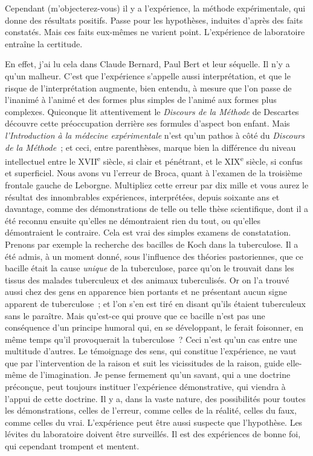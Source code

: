 \documentclass[french,twoside]{book} %
\begin{document}
Cependant (m’objecterez-vous) il y a l’expérience, la méthode expérimentale, qui donne des résultats positifs. Passe pour les hypothèses, induites d’après des faits constatés. Mais ces faits eux-mêmes ne varient point. L’expérience de laboratoire entraîne la certitude.\par
En effet, j’ai lu cela dans Claude Bernard, Paul Bert et leur séquelle. Il n’y a qu’un malheur. C’est que l’expérience s’appelle aussi interprétation, et que le risque de l’interprétation augmente, bien entendu, à mesure que l’on passe de l’inanimé à l’animé et des formes plus simples de l’animé aux formes plus complexes. Quiconque lit attentivement le {\itshape Discours de la Méthode} de Descartes découvre cette préoccupation derrière ses formules d’aspect bon enfant. Mais {\itshape l’Introduction à la médecine expérimentale} n’est qu’un pathos à côté du {\itshape Discours de la Méthode} ; et ceci, entre parenthèses, marque bien la différence du niveau intellectuel entre le XVII\textsuperscript{e} siècle, si clair et pénétrant, et le XIX\textsuperscript{e} siècle, si confus et superficiel. Nous avons vu l’erreur de Broca, quant à l’examen de la troisième frontale gauche de Leborgne. Multipliez cette erreur par dix mille et vous aurez le résultat des innombrables expériences, interprétées, depuis soixante ans et davantage, comme des démonstrations de telle ou telle thèse scientifique, dont il a été reconnu ensuite qu’elles ne démontraient rien du tout, ou qu’elles démontraient le contraire. Cela est vrai des simples examens de constatation. Prenons par exemple la recherche des bacilles de Koch dans la tuberculose. Il a été admis, à un moment donné, sous l’influence des théories pastoriennes, que ce bacille était la cause {\itshape unique} de la tuberculose, parce qu’on le trouvait dans les tissus des malades tuberculeux et des animaux tuberculisés. Or on l’a trouvé aussi chez des gens en apparence bien portants et ne présentant aucun signe apparent de tuberculose ; et l’on s’en est tiré en disant qu’ils étaient tuberculeux sans le paraître. Mais qu’est-ce qui prouve que ce bacille n’est pas une conséquence d’un principe humoral qui, en se développant, le ferait foisonner, en même temps qu’il provoquerait la tuberculose ? Ceci n’est qu’un cas entre une multitude d’autres. Le témoignage des sens, qui constitue l’expérience, ne vaut que par l’intervention de la raison et suit les vicissitudes de la raison, guide elle-même de l’imagination. Je pense fermement qu’un savant, qui a une doctrine préconçue, peut toujours instituer l’expérience démonstrative, qui viendra à l’appui de cette doctrine. Il y a, dans la vaste nature, des possibilités pour toutes les démonstrations, celles de l’erreur, comme celles de la réalité, celles du faux, comme celles du vrai. L’expérience peut être aussi suspecte que l’hypothèse. Les lévites du laboratoire doivent être surveillés. Il est des expériences de bonne foi, qui cependant trompent et mentent.\par
\end{document}
